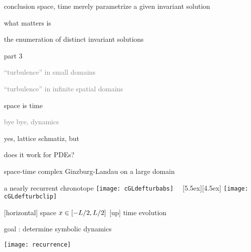 \begin{frame}{conclusion}
space, time  merely parametrize a given invariant solution

\bigskip

what matters is

\vfill

{\Large
the enumeration of distinct invariant solutions
                  }
\end{frame}


\begin{frame}{part 3}
\begin{enumerate}
              \item
    \textcolor{gray}{\small
``turbulence'' in small domains
              \item
``turbulence'' in infinite spatial domains
        }
              \item
    {\Large
space is time
    }\textcolor{gray}{\small
              \item
bye bye, dynamics
                    }
            \end{enumerate}
\end{frame}

\begin{frame}{yes, lattice schmatiz, but}
\begin{center}
{\huge does it work for PDEs?}
\end{center}
\end{frame}


\begin{frame}{space-time complex Ginzburg-Landau on a large domain}
\begin{block}{a nearly recurrent chronotope}
  \texttt{[image: cGLdefturbabs]}%
~~\raisebox{+3.33ex}[5.5ex][4.5ex]
		 {\texttt{[image: cGLdefturbclip]}}
\end{block}

{\footnotesize
[horizontal] space $x \in [-L/2,L/2]$
\qquad
{[up]} time evolution
}
\end{frame}

\begin{frame}{
goal
: determine symbolic dynamics
             }
\begin{center}
\texttt{[image: recurrence]}
\end{center}

\end{frame}


